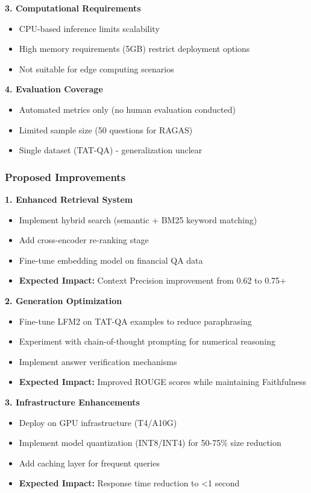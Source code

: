 \textbf{3. Computational Requirements}
\begin{itemize}
    \item CPU-based inference limits scalability
    \item High memory requirements (5GB) restrict deployment options
    \item Not suitable for edge computing scenarios
\end{itemize}

\textbf{4. Evaluation Coverage}
\begin{itemize}
    \item Automated metrics only (no human evaluation conducted)
    \item Limited sample size (50 questions for RAGAS)
    \item Single dataset (TAT-QA) - generalization unclear
\end{itemize}

\subsubsection{Proposed Improvements}

\textbf{1. Enhanced Retrieval System}
\begin{itemize}
    \item Implement hybrid search (semantic + BM25 keyword matching)
    \item Add cross-encoder re-ranking stage
    \item Fine-tune embedding model on financial QA data
    \item \textbf{Expected Impact:} Context Precision improvement from 0.62 to 0.75+
\end{itemize}

\textbf{2. Generation Optimization}
\begin{itemize}
    \item Fine-tune LFM2 on TAT-QA examples to reduce paraphrasing
    \item Experiment with chain-of-thought prompting for numerical reasoning
    \item Implement answer verification mechanisms
    \item \textbf{Expected Impact:} Improved ROUGE scores while maintaining Faithfulness
\end{itemize}

\textbf{3. Infrastructure Enhancements}
\begin{itemize}
    \item Deploy on GPU infrastructure (T4/A10G)
    \item Implement model quantization (INT8/INT4) for 50-75\% size reduction
    \item Add caching layer for frequent queries
    \item \textbf{Expected Impact:} Response time reduction to <1 second
\end{itemize}

